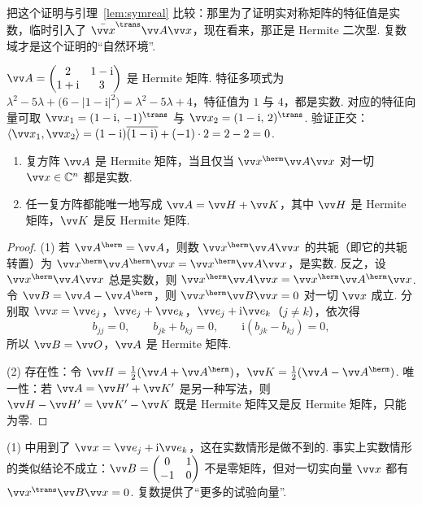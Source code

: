 	把这个证明与引理~\ref{lem:symreal} 比较：那里为了证明实对称矩阵的特征值是实数，临时引入了 $\bar{\vv x}^\trans\vv A\vv x$，现在看来，那正是 Hermite 二次型. 复数域才是这个证明的“自然环境”.
	
	\begin{example}\label{eg:hermitian2}
		$\vv A=\begin{pmatrix}2&1-\mathrm i\\1+\mathrm i&3\end{pmatrix}$ 是 Hermite 矩阵. 特征多项式为 $\lambda^2-5\lambda+\big(6-|1-\mathrm i|^2\big)=\lambda^2-5\lambda+4$，特征值为 $1$ 与 $4$，都是实数. 对应的特征向量可取 $\vv x_1=(1-\mathrm i,\,-1)^\trans$ 与 $\vv x_2=(1-\mathrm i,\,2)^\trans$. 验证正交：$\langle\vv x_1,\vv x_2\rangle=(1-\mathrm i)\overline{(1-\mathrm i)}+(-1)\cdot2=2-2=0$.
	\end{example}
	
	\begin{proposition}\label{prop:hermitianform}
		\begin{enumerate}
			\item 复方阵 $\vv A$ 是 Hermite 矩阵，当且仅当 $\vv x^\herm\vv A\vv x$ 对一切 $\vv x\in\mathbb{C}^n$ 都是实数.
			\item 任一复方阵都能唯一地写成 $\vv A=\vv H+\vv K$，其中 $\vv H$ 是 Hermite 矩阵，$\vv K$ 是反 Hermite 矩阵.
		\end{enumerate}
	\end{proposition}
	\begin{proof}
		(1) 若 $\vv A^\herm=\vv A$，则数 $\vv x^\herm\vv A\vv x$ 的共轭（即它的共轭转置）为 $\vv x^\herm\vv A^\herm\vv x=\vv x^\herm\vv A\vv x$，是实数. 反之，设 $\vv x^\herm\vv A\vv x$ 总是实数，则 $\vv x^\herm\vv A\vv x=\vv x^\herm\vv A^\herm\vv x$. 令 $\vv B=\vv A-\vv A^\herm$，则 $\vv x^\herm\vv B\vv x=0$ 对一切 $\vv x$ 成立. 分别取 $\vv x=\vv e_j$，$\vv e_j+\vv e_k$，$\vv e_j+\mathrm i\vv e_k$（$j\ne k$），依次得
		\[b_{jj}=0,\qquad b_{jk}+b_{kj}=0,\qquad\mathrm i(b_{jk}-b_{kj})=0,\]
		所以 $\vv B=\vv O$，$\vv A$ 是 Hermite 矩阵.
		
		(2) 存在性：令 $\vv H=\frac12(\vv A+\vv A^\herm)$，$\vv K=\frac12(\vv A-\vv A^\herm)$. 唯一性：若 $\vv A=\vv H'+\vv K'$ 是另一种写法，则 $\vv H-\vv H'=\vv K'-\vv K$ 既是 Hermite 矩阵又是反 Hermite 矩阵，只能为零.
	\end{proof}
	
	(1) 中用到了 $\vv x=\vv e_j+\mathrm i\vv e_k$，这在实数情形是做不到的. 事实上实数情形的类似结论不成立：$\vv B=\begin{pmatrix}0&1\\-1&0\end{pmatrix}$ 不是零矩阵，但对一切实向量 $\vv x$ 都有 $\vv x^\trans\vv B\vv x=0$. 复数提供了“更多的试验向量”.
	
